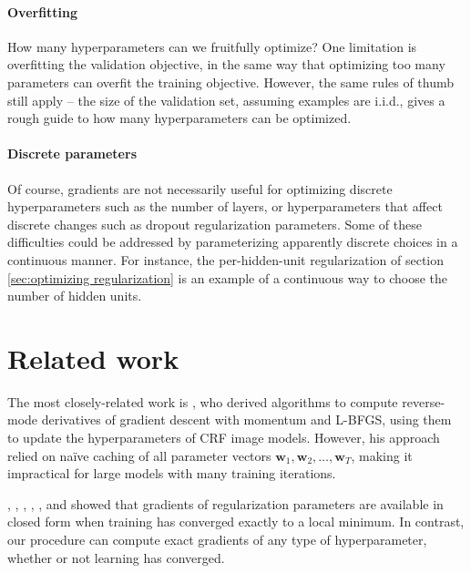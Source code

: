 \documentclass{article}
\newcommand{\vw}{\mathbf{w}}
\newcommand{\params}{\vw}
\begin{document}
\paragraph{Overfitting}
How many hyperparameters can we fruitfully optimize?
One limitation is overfitting the validation objective, in the same way that optimizing too many parameters can overfit the training objective.
However, the same rules of thumb still apply -- the size of the validation set, assuming examples are i.i.d., gives a rough guide to how many hyperparameters can be optimized.



\paragraph{Discrete parameters}
Of course, gradients are not necessarily useful for optimizing discrete hyperparameters such as the number of layers, or hyperparameters that affect discrete changes such as dropout regularization parameters.
Some of these difficulties could be addressed by parameterizing apparently discrete choices in a continuous manner.
For instance, the per-hidden-unit regularization of section \ref{sec:optimizing regularization} is an example of a continuous way to choose the number of hidden units.




\section{Related work}

The most closely-related work is \citet{domke2012generic}, who derived algorithms to compute reverse-mode derivatives of gradient descent with momentum and L-BFGS, using them to update the hyperparameters of CRF image models.
However, his approach relied on na\"ive caching of all parameter vectors $\params_1, \params_2, \dots, \params_T$, making it impractical for large models with many training iterations.

\citet{larsen1998adaptive}, \citet{eigenmann1999gradient}, \citet{chen1999optimal}, \citet{bengio2000gradient}, \citet{abdel2007adaptive}, and \citet{foo2008efficient} showed that gradients of regularization parameters are available in closed form when training has converged exactly to a local minimum.
In contrast, our procedure can compute exact gradients of any type of hyperparameter, whether or not learning has converged.
\end{document}
